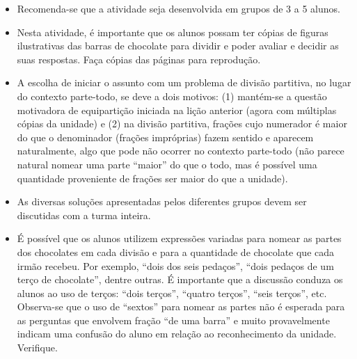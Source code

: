 \begin{multicols}{2}
  \vspace{.1cm}

  \vspace{.1cm}
\begin{itemize} %
   \item Recomenda-se que a atividade seja desenvolvida em grupos de 3 a 5 alunos.
   \item Nesta atividade, é importante que os alunos possam ter cópias de figuras ilustrativas das barras de chocolate para dividir e poder avaliar e decidir as suas respostas. Faça cópias das páginas para reprodução.
   \item A escolha de iniciar o assunto com um problema de divisão partitiva, no lugar do contexto parte-todo, se deve a dois motivos: (1) mantém-se a questão motivadora de equipartição iniciada na lição anterior (agora com múltiplas cópias da unidade) e (2) na divisão partitiva, frações cujo numerador é maior do que o denominador (frações impróprias) fazem sentido e aparecem naturalmente, algo que pode não ocorrer no contexto parte-todo (não parece natural nomear uma parte ``maior'' do que o todo, mas é possível uma quantidade proveniente de frações ser maior do que a unidade).
   \item As diversas soluções apresentadas pelos diferentes grupos devem ser discutidas com a turma inteira.
   \item É possível que os alunos utilizem expressões variadas para nomear as partes dos chocolates em cada divisão e para a quantidade de chocolate que cada irmão recebeu. Por exemplo, ``dois dos seis pedaços'', ``dois pedaços de um terço de chocolate'', dentre outras. É importante que a discussão conduza os alunos ao uso de terços:       ``dois terços'', ``quatro terços'', ``seis terços'', etc. Observa-se que o uso de ``sextos'' para nomear as partes não é esperada para as perguntas que envolvem fração ``de uma barra'' e muito provavelmente indicam uma confusão do aluno em relação ao reconhecimento da unidade. Verifique.
  
\end{itemize} %

\vspace{.1cm}



\end{multicols}
